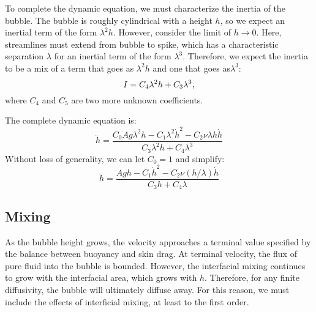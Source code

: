 To complete the dynamic equation, we must characterize the inertia of the bubble.
The bubble is roughly cylindrical with a height $h$, so we expect an inertial term of the form $\lambda^2 h$.
However, consider the limit of $h \rightarrow 0$.  
Here, streamlines must extend from bubble to spike, which has a characteristic separation $\lambda$ for an inertial term of the form $\lambda^3$.
Therefore, we expect the inertia to be a mix of a term that goes as $\lambda^2 h$ and one that goes as$\lambda^3$:
\begin{equation} \elabel{inertia}
I = C_4 \lambda^2 h + C_3 \lambda^3,
\end{equation}
where $C_4$ and $C_5$ are two more unknown coefficients.

The complete dynamic equation is:
\begin{equation}
\ddot{h} = \frac{C_0 A g \lambda^2 h - C_1 \lambda^2 \dot{h}^2 - C_2 \nu \lambda h \dot{h}}{C_3 \lambda^2 h + C_4 \lambda^3}
\end{equation}
Without loss of generality, we can let $C_0 = 1$ and simplify:
\begin{equation}
\ddot{h} = \frac{A g h - C_1 \dot{h}^2 - C_2 \nu (h/\lambda) \dot{h}}{ C_3 h + C_4 \lambda }
\end{equation}

\subsection{Mixing}

As the bubble height grows, the velocity approaches a terminal value specified by the balance between buoyancy and skin drag.
At terminal velocity, the flux of pure fluid into the bubble is bounded.
However, the interfacial mixing continues to grow with the interfacial area, which grows with $h$.
Therefore, for any finite diffusivity, the bubble will ultimately diffuse away.
For this reason, we must include the effects of interficial mixing, at least to the first order.

